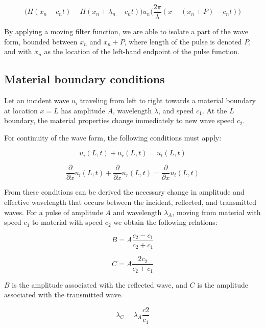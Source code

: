 \documentclass[twocolumn, letterpaper]{article}
\begin{document}
\begin{equation}
\Big(H(x_n - c_nt) - H(x_n + \lambda_n -c_nt)\Big) u_n\Big(\frac{2\pi}{\lambda}(x - (x_n+P) - c_n t)\Big)
\end{equation}

By applying a moving filter function, we are able to isolate a part of the wave form, bounded between $x_n$ and $x_n  +P$, where length of the pulse is denoted $P$, and with $x_n$ as the location of the left-hand endpoint of the pulse function.

\subsection{Material boundary conditions}
Let an incident wave $u_i$ traveling from left to right towards a material boundary at location $x=L$ has amplitude $A$, wavelength $\lambda$, and speed $c_1$. At the $L$ boundary, the material properties change immediately to new wave speed $c_2$.

For continuity of the wave form, the following conditions must apply:

\begin{equation}
u_i(L,t) +u_r(L,t) = u_t(L,t)
\end{equation}

\begin{equation}
 \frac{\partial}{\partial x}   u_i(L,t) +  \frac{\partial}{\partial x} u_r(L,t) =  \frac{\partial}{\partial x} u_t(L,t)
\end{equation}

From these conditions can be derived the necessary change in amplitude and effective wavelength that occurs between the incident, reflected, and transmitted waves. For a pulse of amplitude $A$ and wavelength $\lambda_A$, moving from material with speed $c_1$ to material with speed $c_2$ we obtain the following relations:

\begin{equation}
B = A\frac{c_2-c_1}{c_2+c_1}
\end{equation}

\begin{equation}
C = A\frac{2c_2}{c_2+c_1}
\end{equation}

$B$ is the amplitude associated with the reflected wave, and $C$ is the amplitude associated with the transmitted wave. 

\begin{equation}
\lambda_C = \lambda_A \frac{c2}{c_1}
\end{equation}
\end{document}
